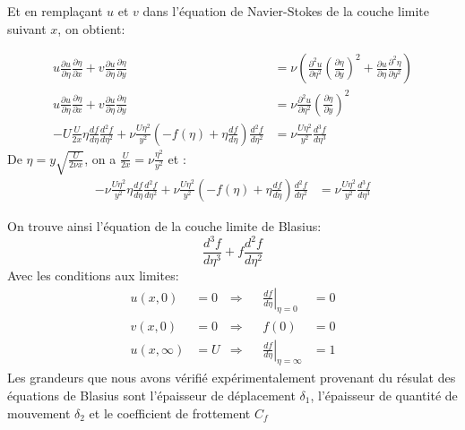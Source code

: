 \documentclass[french]{article}
\begin{document}
Et en remplaçant $u$ et $v$ dans l'équation de Navier-Stokes de la couche limite suivant $x$, on obtient:


\begin{align*}	
	u\frac{\partial u}{\partial \eta}
	\frac{\partial \eta}{\partial x} + 
	v\frac{\partial u}{\partial \eta} 
	\frac{\partial \eta}{\partial y}
	&= \nu\left(
	\frac{\partial^{2} u}{\partial  \eta^{2}}
	\left(
	\frac{\partial \eta}{\partial  y}
	\right)^{2} +
	\frac{\partial u}{\partial  \eta}
	\frac{\partial^{2} \eta}{\partial  y^{2}}
	\right)\\
	u\frac{\partial u}{\partial \eta}
	\frac{\partial \eta}{\partial x} + 
	v\frac{\partial u}{\partial \eta} 
	\frac{\partial \eta}{\partial y}
	&= \nu
	\frac{\partial^{2} u}{\partial  \eta^{2}}
	\left(
	\frac{\partial \eta}{\partial  y}
	\right)^{2} \\
	-U\frac{U}{2x} 
	\eta
	\frac{d f}{d \eta}
	\frac{d^{2} f}{d \eta^{2}}
	+ 
	\nu
	\frac{U\eta^{2}}{y^{2}}
	\left(
	-f(\eta) + \eta\frac{d f}{d \eta}
	\right)
	\frac{d^{2} f}{d \eta^{2}} 
	&= \nu
	\frac{U\eta^{2}}{y^{2}}
	\frac{d^{3} f}{d\eta^{3}}
\end{align*}
De $\eta = y \sqrt{\frac{U}{2\nu x }}$, on a $
	\frac{U}{2x} = \nu 
	\frac{\eta^{2}}{y^{2}}
$ et : 
\begin{align*}	
	-\nu
	\frac{U\eta^{2}}{y^{2}} 
	\eta
	\frac{d f}{d \eta}
	\frac{d^{2} f}{d \eta^{2}}
	+ 
	\nu
	\frac{U\eta^{2}}{y^{2}}
	\left(
	-f(\eta) + \eta\frac{d f}{d \eta}
	\right)
	\frac{d^{2} f}{d \eta^{2}} 
	&= \nu
	\frac{U\eta^{2}}{y^{2}}
	\frac{d^{3} f}{d\eta^{3}}
\end{align*}

On trouve ainsi l'équation de la couche limite de Blasius:
\begin{equation}	
	\frac{d^{3}f}{d\eta^{3}} + f\frac{d^{2} f}{d\eta^{2}}
\end{equation}
Avec les conditions aux limites:
\begin{align}
	u(x,0) &= 0 &\Rightarrow &&
	\left.
	\frac{d f}{d \eta}     \right|_{\eta = 0} &= 0
	\\
	v(x,0) &= 0 &\Rightarrow &&
	f(0) &= 0
	\\
	u(x,\infty) &= U &\Rightarrow &&
	\left.
	\frac{d f}{d \eta} \right|_{\eta = \infty} &= 1
\end{align}
Les grandeurs que nous avons vérifié expérimentalement provenant du résulat des équations de Blasius sont l'épaisseur de déplacement $\delta_{1}$, l'épaisseur de quantité de mouvement $\delta_{2}$ et le coefficient de frottement $C_{f}$
\end{document}
